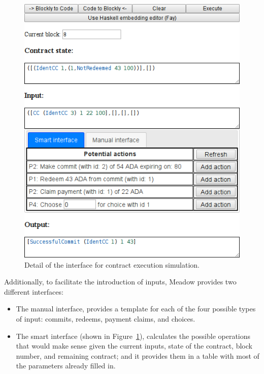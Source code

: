 \documentclass[runningheads]{llncs}
\begin{document}
\begin{figure}[t]
\centering{}\includegraphics[scale=0.52]{pix/detail}\caption{\label{fig:detail-of-interface}Detail of the interface for 
contract
execution simulation.}
\vspace*{-5mm}
\end{figure}

Additionally, to facilitate the introduction of inputs, Meadow provides
two different interfaces:
\begin{itemize}
\item The manual interface, provides a template for each of the four possible types of input:
commits, redeems, payment claims, and choices.
\item The smart interface (shown in Figure~\ref{fig:detail-of-interface}),
calculates the possible operations that would make sense given the
current inputs, state of the contract, block number, and remaining
contract; and it provides them in a table with most of the parameters
already filled in.
\end{itemize}
%
\end{document}
